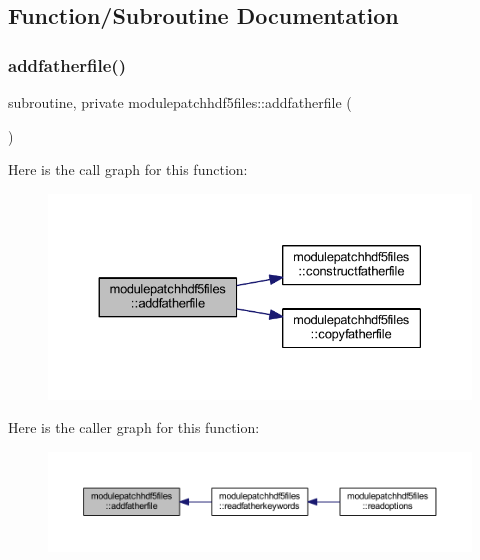 \subsection{Function/\+Subroutine Documentation}
\mbox{\label{namespacemodulepatchhdf5files_af848d5f54e19e27edc34db3cb102d7d4}} 
\subsubsection{\texorpdfstring{addfatherfile()}{addfatherfile()}}
{\footnotesize\ttfamily subroutine, private modulepatchhdf5files\+::addfatherfile (\begin{DoxyParamCaption}{ }\end{DoxyParamCaption})\hspace{0.3cm}{\ttfamily [private]}}

Here is the call graph for this function\+:\nopagebreak
\begin{figure}[H]
\begin{center}
\leavevmode
\includegraphics[width=330pt]{namespacemodulepatchhdf5files_af848d5f54e19e27edc34db3cb102d7d4_cgraph}
\end{center}
\end{figure}
Here is the caller graph for this function\+:\nopagebreak
\begin{figure}[H]
\begin{center}
\leavevmode
\includegraphics[width=350pt]{namespacemodulepatchhdf5files_af848d5f54e19e27edc34db3cb102d7d4_icgraph}
\end{center}
\end{figure}
\mbox{\label{namespacemodulepatchhdf5files_aa9460d2f9601999ea7cafe8b62a22757}} 
